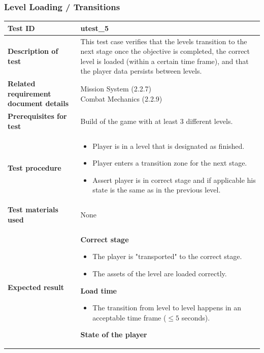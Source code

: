 \documentclass[11pt, a4paper]{article}
\begin{document}
\newpage

\subsubsection{Level Loading / Transitions}

\begin{center}
\begin{tabularx}{\linewidth}{|>{\raggedright\arraybackslash}m{4cm}|X|}
    \hline
    \textbf{Test ID} & utest\_5 \\
    \hline
    \textbf{Description of test} & This test case verifies that the levels transition to the next stage once the objective is completed, the correct level is loaded (within a certain time frame), and that the player data persists between levels. \\
    \hline
    \textbf{Related requirement document details} & \makecell[l]{
        Mission System (2.2.7) \\
        Combat Mechanics (2.2.9)
    } \\
    \hline
    \textbf{Prerequisites for test} & Build of the game with at least 3 different levels. \\
    \hline
    \textbf{Test procedure} &
    \begin{itemize}
        \item Player is in a level that is designated as finished.
        \item Player enters a transition zone for the next stage.
        \item Assert player is in correct stage and if applicable his state is the same as in the previous level.
    \end{itemize}
    \\
    \hline
    \textbf{Test materials used} & None \\
    \hline
    \textbf{Expected result} &
    \textbf{Correct stage}
    \begin{itemize}
        \item The player is "transported" to the correct stage.
        \item The assets of the level are loaded correctly.
    \end{itemize}
    \textbf{Load time}
    \begin{itemize}
        \item The transition from level to level happens in an acceptable time frame ($\leq 5$ seconds).
    \end{itemize}
    \textbf{State of the player}

\end{tabularx}
\end{center}
\end{document}
